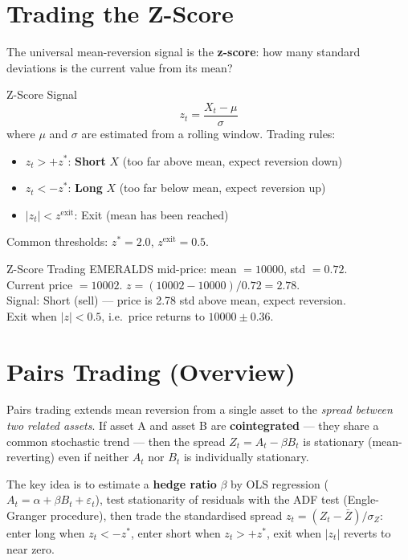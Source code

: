 \documentclass[12pt,a4paper,openany]{report}
\theoremstyle{definition}
\begin{document}
\section{Trading the Z-Score}

The universal mean-reversion signal is the \textbf{z-score}: how many standard deviations is the current value from its mean?

\begin{definitionbox}{Z-Score Signal}
\[
  z_t = \frac{X_t - \mu}{\sigma}
\]
where $\mu$ and $\sigma$ are estimated from a rolling window. Trading rules:
\begin{itemize}
  \item $z_t > +z^*$: \textbf{Short} $X$ (too far above mean, expect reversion down)
  \item $z_t < -z^*$: \textbf{Long} $X$ (too far below mean, expect reversion up)
  \item $|z_t| < z^{\text{exit}}$: Exit (mean has been reached)
\end{itemize}
Common thresholds: $z^* = 2.0$, $z^{\text{exit}} = 0.5$.
\end{definitionbox}

\begin{examplebox}{Z-Score Trading}
EMERALDS mid-price: mean $= 10000$, std $= 0.72$. \\
Current price $= 10002$. $z = (10002 - 10000)/0.72 = 2.78$. \\
Signal: Short (sell) — price is 2.78 std above mean, expect reversion. \\
Exit when $|z| < 0.5$, i.e.\ price returns to $10000 \pm 0.36$.
\end{examplebox}

\section{Pairs Trading (Overview)}

Pairs trading extends mean reversion from a single asset to the \emph{spread between two related assets}. If asset A and asset B are \textbf{cointegrated} — they share a common stochastic trend — then the spread $Z_t = A_t - \beta B_t$ is stationary (mean-reverting) even if neither $A_t$ nor $B_t$ is individually stationary.

The key idea is to estimate a \textbf{hedge ratio} $\beta$ by OLS regression ($A_t = \alpha + \beta B_t + \varepsilon_t$), test stationarity of residuals with the ADF test (Engle-Granger procedure), then trade the standardised spread $z_t = (Z_t - \bar{Z})/\sigma_Z$: enter long when $z_t < -z^*$, enter short when $z_t > +z^*$, exit when $|z_t|$ reverts to near zero.
\end{document}
